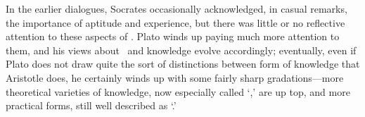 \documentclass[11pt,letterpaper,oneside]{amsart} %
\begin{document}
In the earlier dialogues, Socrates occasionally acknowledged, in casual remarks, the importance of aptitude and experience, but there was little or no reflective attention to these aspects of \techne. Plato winds up paying much more attention to them, and his views about \techne\ and knowledge evolve accordingly; eventually, even if Plato does not draw quite the sort of distinctions between form of knowledge that Aristotle does, he certainly winds up with some fairly sharp gradations---more theoretical varieties of knowledge, now especially called `\epistemai,' are up top, and more practical forms, still well described as `\technai.'















\end{document}
